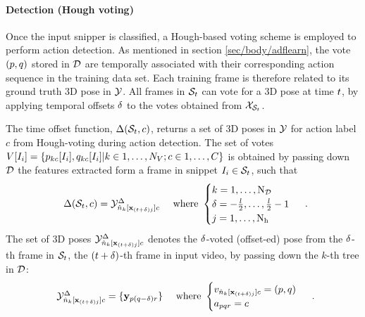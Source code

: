 \paragraph{Detection (Hough voting)}
Once the input snipper is classified, a Hough-based voting scheme is employed to perform action detection. 
As mentioned in section \ref{sec/body/adflearn}, the vote $(p,q)$ stored in $\mathcal{D}$ are temporally associated with their corresponding action sequence in the training data set. Each training frame is therefore related to its ground truth 3D pose in $\mathcal{Y}$. All frames in $\mathcal{S}_{t}$ can vote for a 3D pose at time $t$, by applying temporal offsets $\delta$ to the votes obtained from $\mathcal{X}_{\mathcal{S}_{t}}$. 

The time offset function, $\Delta(\mathcal{S}_{t},c)$, returns a set of 3D poses in $\mathcal{Y}$ for action label $c$ from Hough-voting during action detection. 
The set of votes $V[I_i] = \{ p_{k c}[I_{i}], q_{k c}[I_{i}]|k\in1,\dots,N_{V};c\in1,\dots,C\}$ is obtained by passing down $\mathcal{D}$ the features extracted form a frame in snippet $I_{i} \in \mathcal{S}_{t}$, such that 
\begin{equation} 
	\begin{array}{lr}
		\Delta(\mathcal{S}_{t}, c) = \mathcal{Y}^{\Delta}_{{\hat{n}}_{k}[\mathbf{x}_{(t+\delta)j}]c}
		& \mbox{ where } 
		\begin{cases}
			k = 1,\dots,\mathrm{N_{\mathcal{D}}} \\ 
			\delta = -\frac{l}{2},\dots,\frac{l}{2}-1\\ 
			j = 1,\dots,\mathrm{N_{h}}  
		\end{cases}
	\end{array}.
\end{equation}
The set of 3D poses $\mathcal{Y}^{\Delta}_{{\hat{n}}_{k}[\mathbf{x}_{(t+\delta)j}]c}$ denotes the $\delta$-voted (offset-ed) pose from the $\delta$-th frame in $\mathcal{S}_{t}$, \ie the $(t + \delta)$-th frame in input video, by passing down the $k$-th tree in $\mathcal{D}$:
\begin{equation}
	\begin{array}{lr}
		\mathcal{Y}^{\Delta}_{{\hat{n}}_{k}[\mathbf{x}_{(t+\delta)j}]c} = \{\mathbf{y}_{p(q-\delta)r}\}
		& \mbox{ where }
		\begin{cases}
			v_{{\hat{n}}_{k}[\mathbf{x}_{(t+\delta)j}]c} = (p, q) \\ 
			a_{pqr} = c 
		\end{cases}
	\end{array}.
\end{equation} 
